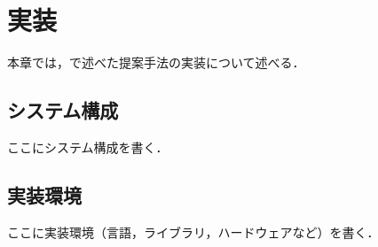 \chapter{実装}\label{chap:implementation}
本章では，で述べた提案手法の実装について述べる．

\section{システム構成}
ここにシステム構成を書く．

\section{実装環境}
ここに実装環境（言語，ライブラリ，ハードウェアなど）を書く．

